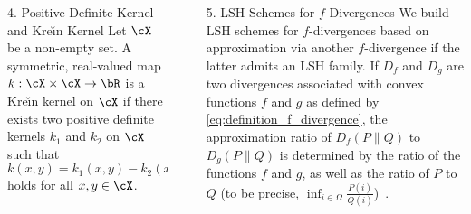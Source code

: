 \documentclass[final]{beamer}
\newcommand{\kr}{Kre\u{\i}n\xspace}
\newlength{\sepwid}
\newlength{\onecolwid}
\begin{document}
\begin{frame}[t]
\begin{columns}[t]
\begin{column}{\onecolwid}
\begin{block}{4. Positive Definite Kernel and \kr Kernel}
	\structure{\textbf{\kr kernel~\citep{ong2004learning}}}
		Let $ \cX $ be a non-empty set. A symmetric, real-valued map $ 
		k:\cX\times\cX\to \bR $ is a \kr kernel on $ \cX $ if there exists two 
		positive definite kernels $ k_1 $ and $ k_2 $ on $ \cX $ such that $ 
		k(x,y)=k_1(x,y)-k_2(x,y) $ holds for all $ x,y\in \cX $.

\end{block}



\end{column} %
 		\begin{column}{\sepwid}\end{column} %
\begin{column}{\onecolwid} %
	\vspace{-40pt}
	
	\begin{block}{5. LSH Schemes for $ f $-Divergences}
		We build LSH schemes for $ f $-divergences based on approximation via 
		another $ 
		f $-divergence if the latter admits an LSH family. If $ D_f $ and $ D_g 
		$ are 
		two divergences associated with convex functions $ f $ and $ g $ as 
		defined by 
		\eqref{eq:definition_f_divergence}, the approximation ratio of $ 
		D_f(P\parallel Q) $ to $ D_g(P \parallel Q) $ is determined by the 
		ratio of 
		the functions $ f $ and $ g $, as well as the ratio of $ P $ to $ Q $ 
		(to 
		be precise, $ \inf_{i\in \Omega} \frac{P(i)}{Q(i)} 
		$)~\citep{sason2016f}.
		
		
		
		
		

\end{block}
\end{column}
\end{columns}
\end{frame}
\end{document}
